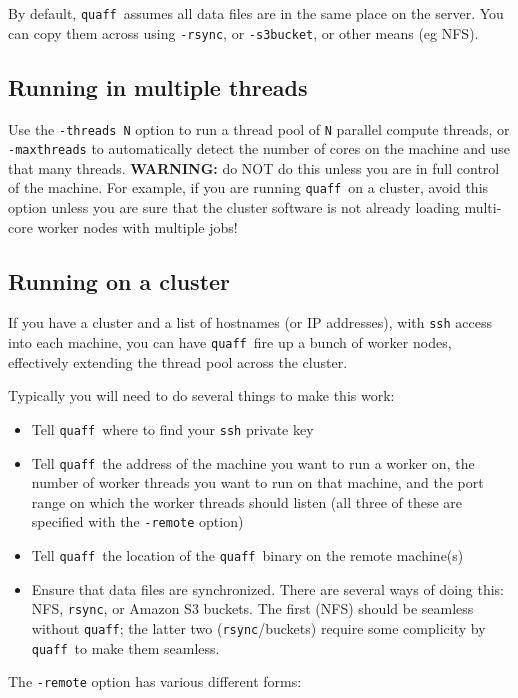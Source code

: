 \documentclass{article}
\newcommand\quaff{{\tt quaff}}
\newcommand\opt[1]{{\tt -#1}}
\begin{document}
By default, \quaff\ assumes all data files are in the same place on the server.
You can copy them across using \opt{rsync}, or \opt{s3bucket}, or other means (eg NFS).

\subsection{Running in multiple threads}

Use the \opt{threads N} option to run a thread pool of {\tt N} parallel compute threads,
or \opt{maxthreads} to automatically detect the number of cores on the machine
and use that many threads.
{\bf WARNING:} do NOT do this unless you are in full control of the machine.
For example, if you are running \quaff\ on a cluster, avoid this option unless you
are sure that the cluster software is not already loading multi-core worker nodes
with multiple jobs!

\subsection{Running on a cluster}

If you have a cluster and a list of hostnames (or IP addresses),
with {\tt ssh} access into each machine,
you can have \quaff\ fire up a bunch of worker nodes,
effectively extending the thread pool across the cluster.

Typically you will need to do several things to make this work:
\begin{itemize}
  \item Tell \quaff\ where to find your {\tt ssh} private key
  \item Tell \quaff\ the address of the machine you want to run a worker on,
    the number of worker threads you want to run on that machine,
    and the port range on which the worker threads should listen
    (all three of these are specified with the \opt{remote} option)
  \item Tell \quaff\ the location of the \quaff\ binary on the remote machine(s)
  \item Ensure that data files are synchronized.
    There are several ways of doing this: NFS, {\tt rsync}, or Amazon S3 buckets.
    The first (NFS) should be seamless without \quaff; the latter two ({\tt rsync}/buckets)
    require some complicity by \quaff\ to make them seamless.
\end{itemize}

The \opt{remote} option has various different forms:
\end{document}

